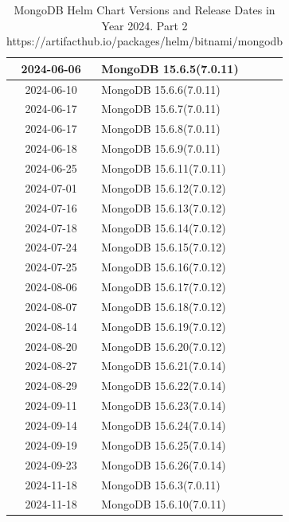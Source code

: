 \documentclass[../main.tex]{subfiles}
\begin{document}
\begin{table}[h]
\begin{minipage}{0.45\textwidth}
\begin{tabular}{|c|l|}
    2024-06-06 & MongoDB 15.6.5(7.0.11) \\ \hline  
    2024-06-10 & MongoDB 15.6.6(7.0.11) \\ \hline  
    2024-06-17 & MongoDB 15.6.7(7.0.11) \\ \hline  
    2024-06-17 & MongoDB 15.6.8(7.0.11) \\ \hline  
    2024-06-18 & MongoDB 15.6.9(7.0.11) \\ \hline  
    2024-06-25 & MongoDB 15.6.11(7.0.11) \\ \hline
    2024-07-01 & MongoDB 15.6.12(7.0.12) \\ \hline  
    2024-07-16 & MongoDB 15.6.13(7.0.12) \\ \hline  
    2024-07-18 & MongoDB 15.6.14(7.0.12) \\ \hline  
    2024-07-24 & MongoDB 15.6.15(7.0.12) \\ \hline  
    2024-07-25 & MongoDB 15.6.16(7.0.12) \\ \hline
    2024-08-06 & MongoDB 15.6.17(7.0.12) \\ \hline  
    2024-08-07 & MongoDB 15.6.18(7.0.12) \\ \hline  
    2024-08-14 & MongoDB 15.6.19(7.0.12) \\ \hline  
    2024-08-20 & MongoDB 15.6.20(7.0.12) \\ \hline  
    2024-08-27 & MongoDB 15.6.21(7.0.14) \\ \hline
    2024-08-29 & MongoDB 15.6.22(7.0.14) \\ \hline
    2024-09-11 & MongoDB 15.6.23(7.0.14) \\ \hline  
    2024-09-14 & MongoDB 15.6.24(7.0.14) \\ \hline  
    2024-09-19 & MongoDB 15.6.25(7.0.14) \\ \hline  
    2024-09-23 & MongoDB 15.6.26(7.0.14) \\ \hline 
    2024-11-18 & MongoDB 15.6.3(7.0.11) \\ \hline
    2024-11-18 & MongoDB 15.6.10(7.0.11) \\ \hline
\end{tabular}
\caption{MongoDB Helm Chart Versions and Release Dates in Year 2024. Part 2 https://artifacthub.io/packages/helm/bitnami/mongodb}
\label{table:mongodb_helm_versions}
\end{minipage}
\end{table}
\end{document}
